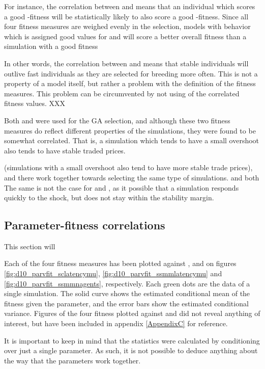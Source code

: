 For instance, the correlation between \overshoot and \stdev means that an individual which scores a good \overshoot-fitness will be statistically likely to also score a good \stdev-fitness. Since all four fitness measures are weighed evenly in the selection, models with behavior which is assigned good values for \overshoot and \stdev will score a better overall fitness than a simulation with a good fitness 

In other words, the correlation between \stdev and \overshoot means that stable individuals will outlive fast individuals as they are selected for breeding more often. This is not a property of a model itself, but rather a problem with the definition of the fitness measures. This problem can be circumvented by not using of the correlated fitness values. XXX

Both \overshoot and \stdev were used for the GA selection, and although these two fitness measures do reflect different properties of the simulations, they were found to be somewhat correlated. That is, a simulation which tends to have a small overshoot also tends to have stable traded prices. 

 (simulations with a small overshoot also tend to have more stable trade prices), and there work together towards selecting the same type of simulations. \timetoreachnewfundamental and \roundstable both  The same is not the case for \timetoreachnewfundamental and \roundstable, as it possible that a simulation responds quickly to the shock, but does not stay within the stability margin. 


\subsection{Parameter-fitness correlations}
This section will 

Each of the four fitness measures has been plotted against \sclatencymu, \ssmmlatencymu and \ssmmnAgents on figures \ref{fig:d10_parvfit_sclatencymu}, \ref{fig:d10_parvfit_ssmmlatencymu} and \ref{fig:d10_parvfit_ssmmnagents}, respectively. Each green dots are the data of a single simulation. The solid curve shows the estimated conditional mean of the fitness given the parameter, and the error bars show the estimated conditional variance. Figures of the four fitness plotted against \sclatencys and \ssmmlatencys did not reveal anything of interest, but have been included in appendix \ref{AppendixC} for reference.

It is important to keep in mind that the statistics were calculated by conditioning over just a single parameter. As such, it is not possible to deduce anything about the way that the parameters work together. 



